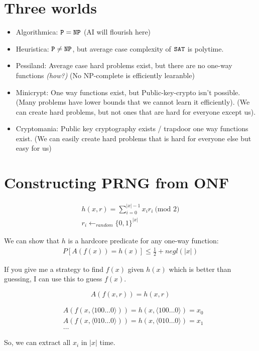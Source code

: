 \section{Three worlds}
\begin{itemize}
\item Algorithmica: $\texttt{P} = \texttt{NP}$ (AI will flourish here)
\item Heuristica: $\texttt{P} \neq \texttt{NP}$, but average case complexity of $\texttt{SAT}$ is polytime.
\item Pessiland: Average case hard problems exist, but there are no one-way functions \textit{(how?)}
(No NP-complete is efficiently learanble)

\item Minicrypt: One way functions exist, but Public-key-crypto isn't possible.
    (Many problems have lower bounds that we cannot learn it efficiently).
    (We can create hard problems, but not ones that are hard for everyone except us).

\item Cryptomania: Public key cryptography exists / trapdoor one way functions exist.
(We can easily create hard problems that is hard for everyone else but easy for us)
\end{itemize}


\section{Constructing PRNG from ONF}


\begin{align*}
h(x, r) = \sum_{i=0}^{|x| - 1} x_i r_i ~\text{(mod $2$)} \\
r_i \leftarrow_{random} \{ 0, 1\}^{|x|}
\end{align*}

We can show that $h$ is a hardcore predicate for any one-way function:
\begin{align*}
    P[A(f(x)) = h(x)] \leq \frac{1}{2} + negl(|x|)
\end{align*}

If you  give me a strategy to find $f(x)$ given $h(x)$ which is better than
guessing, I can use this to guess $f(x)$.

$$
A(f(x, r)) = h(x, r)
$$

\begin{align*}
    &A(f(x, \langle 1 0 0 \dots 0 \rangle)) = h(x, \langle 1 0 0 \dots 0 \rangle) = x_0 \\
    &A(f(x, \langle 0 1 0 \dots 0 \rangle)) = h(x, \langle 0 1 0 \dots 0 \rangle) = x_1 \\
    &\dots 
\end{align*}

So, we can extract all $x_i$ in $|x|$ time.


